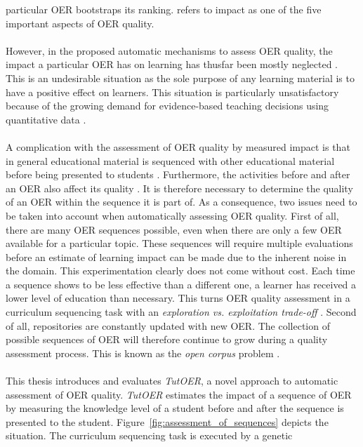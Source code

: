 particular OER bootstraps its ranking. \citet{Camilleri2014} refers to impact
as one of the five important aspects of OER quality.\\\\
\noindent
However, in the proposed automatic mechanisms to assess OER quality, the impact
a particular OER has on learning has thusfar been mostly neglected
\citep{Kay2007}. This is an undesirable situation as the sole purpose of any
learning material is to have a positive effect on learners. This situation is
particularly unsatisfactory because of the growing demand for evidence-based
teaching decisions using quantitative data \citep{Wayman2005, Marsh2006, Spillane2012, Clow2013}.\\\\
\noindent
A complication with the assessment of OER quality by measured impact is that in
general educational material is sequenced with other educational material
before being presented to students \citep{Brusilovsky1992, Quinn2000}.
Furthermore, the activities before and after an OER also affect its quality
\citep{Duval2006}. It is therefore necessary to determine the quality of an OER
within the sequence it is part of. As a consequence, two issues need to be
taken into account when automatically assessing OER quality. First of all,
there are many OER sequences possible, even when there are only a few OER
available for a particular topic. These sequences will require multiple
evaluations before an estimate of learning impact can be made due to the
inherent noise in the domain. This experimentation clearly does not come
without cost. Each time a sequence shows to be less effective than a different
one, a learner has received a lower level of education than necessary. This
turns OER quality assessment in a curriculum sequencing task
\citep{AlMuhaideb2011} with an \emph{exploration vs. exploitation trade-off}
\citep{Holland1992}. Second of all, repositories are constantly updated with
new OER. The collection of possible sequences of OER will therefore continue to
grow during a quality assessment process. This is known as the \emph{open
corpus} problem \citep{Brusilovsky2007}.\\\\
\noindent
This thesis introduces and evaluates \emph{TutOER}, a novel approach to
automatic assessment of OER quality. \emph{TutOER} estimates the impact of a
sequence of OER by measuring the knowledge level of a student before and after the
sequence is presented to the student. Figure~\ref{fig:assessment_of_sequences}
depicts the situation. The curriculum sequencing task is executed by a genetic
